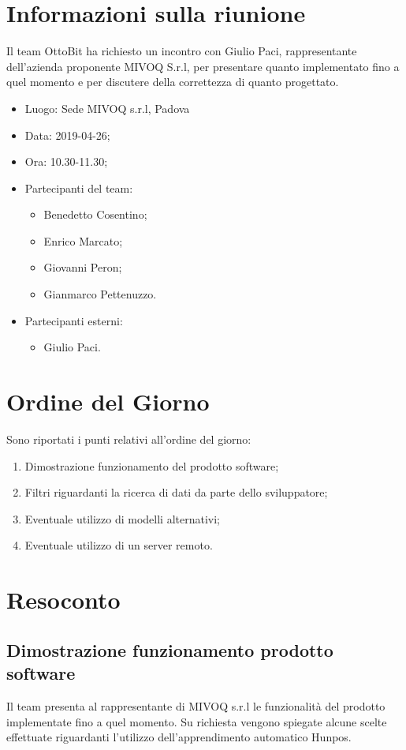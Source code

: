 \documentclass[11pt,a4paper]{article}
\begin{document}
	\section{Informazioni sulla riunione}
	Il team OttoBit ha richiesto un incontro con Giulio Paci, rappresentante dell'azienda proponente MIVOQ S.r.l, per presentare quanto implementato fino a quel momento e per discutere della correttezza di quanto progettato.
	\begin{itemize}
		\item Luogo: Sede MIVOQ s.r.l, Padova
		\item Data: 2019-04-26;
		\item Ora: 10.30-11.30;
		\item Partecipanti del team:
		\begin{itemize}
			\item Benedetto Cosentino;
			\item Enrico Marcato;
			\item Giovanni Peron;
			\item Gianmarco Pettenuzzo.
			
		\end{itemize}
	\item Partecipanti esterni:
	\begin{itemize}
		\item Giulio Paci.
	\end{itemize}
	\end{itemize}
	
	\section{Ordine del Giorno}
	Sono riportati i punti relativi all'ordine del giorno:
	\begin{enumerate}
		\item Dimostrazione funzionamento del prodotto software;
		\item Filtri riguardanti la ricerca di dati da parte dello sviluppatore;
		\item Eventuale utilizzo di modelli alternativi;
		\item Eventuale utilizzo di un server remoto.
	\end{enumerate}
	
	\section{Resoconto}
	\subsection{Dimostrazione funzionamento prodotto software}
	Il team presenta al rappresentante di MIVOQ s.r.l le funzionalità del prodotto implementate fino a quel momento.
	Su richiesta vengono spiegate alcune scelte effettuate riguardanti l'utilizzo dell'apprendimento automatico Hunpos.
\end{document}
